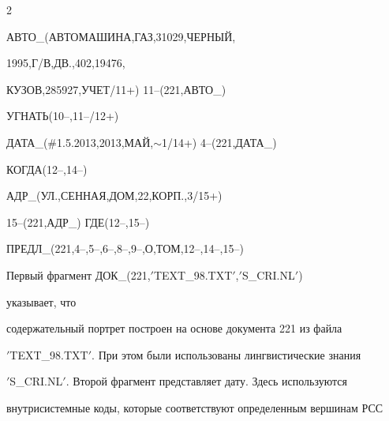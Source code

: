 \begin{multicols}{2}
{ \noindent


 АВТО\_(АВТОМАШИНА,ГАЗ,31029,ЧЕРНЫЙ,





 1995,Г/В,ДВ.,402,19476,


КУЗОВ,285927,УЧЕТ/11+) 11--(221,АВТО\_)





 \noindent


 УГНАТЬ(10--,11--/12+)





 \noindent


 ДАТА\_(\#1.5.2013,2013,МАЙ,$\sim$1/14+) 4--(221,ДАТА\_)





 \noindent


 КОГДА(12--,14--)





 \noindent


 АДР\_(УЛ.,СЕННАЯ,ДОМ,22,КОРП.,3/15+)





  15--(221,АДР\_) ГДЕ(12--,15--)





 \noindent


 ПРЕДЛ\_(221,4--,5--,6--,8--,9--,О,ТОМ,12--,14--,15--)





 }





 \medskip





 Первый фрагмент ДОК\_(221,$'$TEXT\_98.TXT$'$,\linebreak $'$S\_CRI.NL$'$)


 указывает, что


содержательный портрет построен на основе документа 221 из файла


$'$TEXT\_98.TXT$'$. При этом были использованы лингвистические знания


$'$S\_CRI.NL$'$. Второй фрагмент представляет дату. Здесь используются


внут\-ри\-сис\-тем\-ные коды, которые соответствуют определенным вершинам РСС



\end{multicols}
